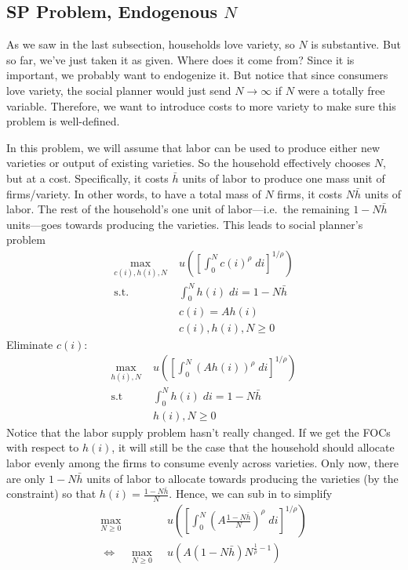 \documentclass[12pt]{article}
\theoremstyle{plain}
\theoremstyle{definition}
\theoremstyle{remark}
\newcommand{\ra}{\rightarrow}
\newcommand{\intzN}{\int_0^N}
\begin{document}
\clearpage
\subsection{SP Problem, Endogenous $N$}

As we saw in the last subsection, households love variety, so $N$ is
substantive. But so far, we've just taken it as given. Where does it
come from? Since it is important, we probably want to endogenize it.
But notice that since consumers love variety, the social planner would
just send $N\ra \infty$ if $N$ were a totally free variable. Therefore,
we want to introduce costs to more variety to make sure this problem is
well-defined.

In this problem, we will assume that labor can be used to produce either
new varieties or output of existing varieties. So the household
effectively chooses $N$, but at a cost. Specifically, it costs $\bar{h}$
units of labor to produce one mass unit of firms/variety. In other
words, to have a total mass of $N$ firms, it costs $N\bar{h}$ units of
labor.  The rest of the household's one unit of
labor---i.e.\ the remaining $1-N\bar{h}$ units---goes towards producing
the varieties. This leads to social planner's problem
\begin{align*}
  \max_{c(i),h(i),N}
    & \; u\left(
      \left[ \int_0^N c(i)^\rho \; di \right]^{1/\rho}
    \right)
  \\
  \text{s.t.} & \;
  \intzN h(i) \; di = 1 - N\bar{h}\\
  &\; c(i) = Ah(i) \\
  &\; c(i),h(i),N \geq 0
\end{align*}
Eliminate $c(i)$:
\begin{align*}
  \max_{h(i),N}
    & \; u\left(
      \left[ \int_0^N \left(Ah(i)\right)^\rho \; di \right]^{1/\rho}
    \right)
  \\
  \text{s.t} & \;
  \intzN h(i) \; di = 1 - N\bar{h}\\
  &\; h(i),N \geq 0
\end{align*}
Notice that the labor supply problem hasn't really changed. If we get
the FOCs with respect to $h(i)$, it will still be the case that the
household should allocate labor evenly among the firms to consume evenly
across varieties. Only now, there are only $1-N\bar{h}$ units of labor
to allocate towards producing the varieties (by the constraint) so that
$h(i)=\frac{1-N\bar{h}}{N}$. Hence, we can sub in to simplify
\begin{align*}
  \max_{N\geq 0}
    & \; u\left(
      \left[ \int_0^N \left(A\frac{1-N\bar{h}}{N}\right)^\rho \; di \right]^{1/\rho}
    \right) \\
  \Leftrightarrow\quad
  \max_{N\geq 0}
    & \; u\left(
      A(1-N\bar{h})
      N^{\frac{1}{\rho}-1}
    \right)
\end{align*}
\end{document}
